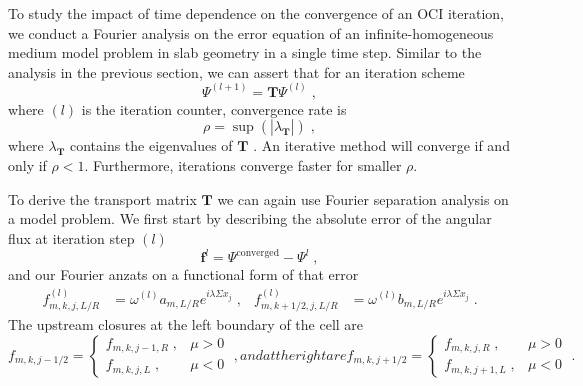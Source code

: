 


\newcommand{\exi}{e^{i\lambda\Sigma x_j}}
\newcommand{\omlp}{\omega^{(l+1)}}
\newcommand{\oml}{\omega^{(l)}}
\newcommand{\dx}{\Delta x}
\newcommand{\dt}{\Delta t}
\newcommand{\scatsum}{\sum^{M}_{n=0}}


To study the impact of time dependence on the convergence of an OCI iteration, we conduct a Fourier analysis on the error equation of an infinite-homogeneous medium model problem in slab geometry in a single time step.
Similar to the analysis in the previous section, we can assert that for an iteration scheme
\begin{equation}
    \Psi^{(l+1)} = \bm{T} \Psi^{(l)} \;,
\end{equation}
where $(l)$ is the iteration counter, convergence rate is
\begin{equation}
   \rho = \sup(|\lambda_{\bm{T}}|)\;,
\end{equation}
 where $\lambda_{\bm{T}}$ contains the eigenvalues of $\bm{T}$ \cite{golub_matrix_1983, isaacson_numerical_1966}.
An iterative method will converge if and only if $\rho<1$. 
Furthermore, iterations converge faster for smaller $\rho$.

To derive the transport matrix $\bm{T}$ we can again use Fourier separation analysis on a model problem.
We first start by describing the absolute error of the angular flux at iteration step $(l)$
\begin{equation}
    \mathbf{f}^l = \Psi^{\text{converged}} - \Psi^l \;,
\end{equation}
and our Fourier anzats on a functional form of that error
\begin{subequations}
    \label{eq:anz}
    \begin{align}
        f^{(l)}_{m,k,j,L/R} &= \omega^{(l)}a_{m,L/R}e^{i\lambda\Sigma x_j} \; ,
        &
        f^{(l)}_{m,k+1/2,j,L/R} &= \omega^{(l)}b_{m,L/R}e^{i\lambda\Sigma x_j} \;.
    \end{align}
\end{subequations} 
The upstream closures at the left boundary of the cell are
\begin{subequations}
\begin{equation}
    f_{m,k,j-1/2} =
    \begin{cases}
        f_{m,k,j-1, R} \;, & \mu > 0 \\
        f_{m,k,j, L} \;, & \mu < 0 
    \end{cases} \;,
\end{equation}
and at the right are
\begin{equation}
    f_{m,k,j+1/2} =
    \begin{cases}
        f_{m,k,j, R} \;, & \mu > 0 \\
        f_{m,k,j+1, L} \;, & \mu < 0 
    \end{cases} \;.
\end{equation}
\end{subequations}

